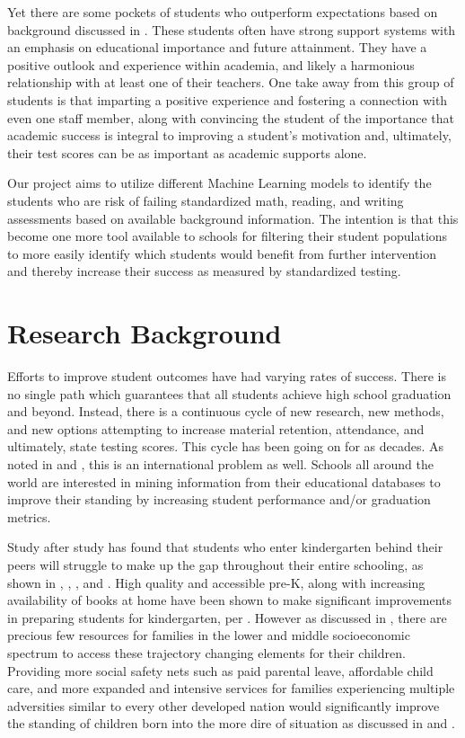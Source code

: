 \documentclass[man,floatsintext]{apa6} %
\begin{document}
Yet there are some pockets of students who outperform expectations based on background discussed in \cite{YanGaiLowSEG}. These students often have strong support systems with an emphasis on educational importance and future attainment. They have a positive outlook and experience within academia, and likely a harmonious relationship with at least one of their teachers. One take away from this group of students is that imparting a positive experience and fostering a connection with even one staff member, along with convincing the student of the importance that academic success is integral to improving a student's motivation and, ultimately, their test scores can be as important as academic supports alone.

Our project aims to utilize different Machine Learning models to identify the students who are risk of failing standardized math, reading, and writing assessments based on available background information.  The intention is that this become one more tool available to schools for filtering their student populations to more easily identify which students would benefit from further intervention and thereby increase their success as measured by standardized testing.

\section{Research Background}
Efforts to improve student outcomes have had varying rates of success. There is no single path which guarantees that all students achieve high school graduation and beyond.  Instead, there is a continuous cycle of new research, new methods, and new options attempting to increase material retention, attendance, and ultimately, state testing scores. This cycle has been going on for as decades. As noted in \cite{AustraliaSES} and \cite{Malaysia}, this is an international problem as well. Schools all around the world are interested in mining information from their educational databases to improve their standing by increasing student performance and/or graduation metrics.  

Study after study has found that students who enter kindergarten behind their peers will struggle to make up the gap throughout their entire schooling, as shown in \cite{EdInequities}, \cite{sesbehind1}, \cite{sesbehind2}, and \cite{sesbehind3}. High quality and accessible pre-K, along with increasing availability of books at home have been shown to make significant improvements in preparing students for kindergarten, per \cite{earlyengageML}. However as discussed in \cite{cradleK}, there are precious few resources for families in the lower and middle socioeconomic spectrum to access these trajectory changing elements for their children. Providing more social safety nets such as paid parental leave, affordable child care, and more expanded and intensive services for families experiencing multiple adversities similar to every other developed nation would significantly improve the standing of children born into the more dire of situation as discussed in \cite{duncan2013long} and \cite{duncan2012importance}.
\end{document}
